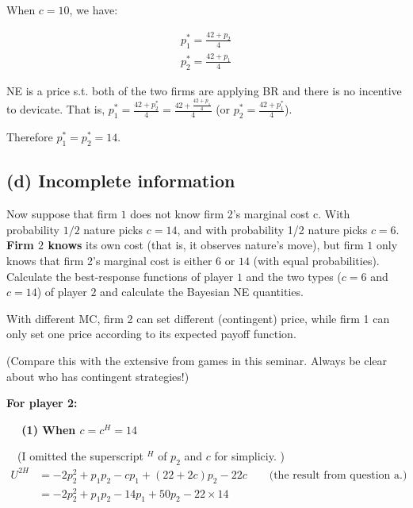 \documentclass{article}
\begin{document}
\medskip

When $c = 10$, we have:

\begin{align*}
p^*_1 = \frac{42+p_2}{4} \\
p^*_2 = \frac{42+p_1}{4}
\end{align*}

NE is a price s.t. both of the two firms are applying BR and there is no incentive to devicate.
That is, $p^*_1 = \frac{42+p^*_2}{4} =\frac{42+\frac{42+p_1}{4}}{4}$ (or $p^*_2 = \frac{42+p^*_1}{4}$).

Therefore $p^*_1 = p^*_2 =14$.

\subsection*{(d) Incomplete information} Now suppose that firm $1$ does not know firm 2's marginal cost c. With
probability $1/2$ nature picks $c = 14$, and with probability 1/2 nature
picks $c = 6$. \textbf{Firm $2$ knows} its own cost (that is, it observes nature's
move), but firm $1$ only knows that firm 2's marginal cost is either $6$ or
$14$ (with equal probabilities). Calculate the best-response functions of
player $1$ and the two types ($c = 6$ and $c = 14$) of player $2$ and calculate
the Bayesian NE quantities.

\bigskip

\begin{mdframed}[backgroundcolor=blue!20,linecolor=white]
With different MC, firm 2 can set different (contingent) price, while firm 1 can only set one price according to its expected payoff function.
\medskip

(Compare this with the extensive from games in this seminar. Always be clear about who has contingent strategies!)

\end{mdframed}

\textbf{For player 2:}

\medskip

\textbf{$\quad $ (1) When $c=c^H=14$}

\smallskip

$\quad $(I omitted the superscript $^H$ of $p_2$ and $c$ for simpliciy. )
\begin{align*}
U^{2H} &= -2p_2^2 +p_1p_2 -cp_1 + (22+2c)p_2 -22c \quad \quad \text{(the result from question a.)}  \\
&= -2p_2^2 +p_1p_2 -14p_1 + 50p_2 -22 \times 14
\end{align*}
\end{document}
